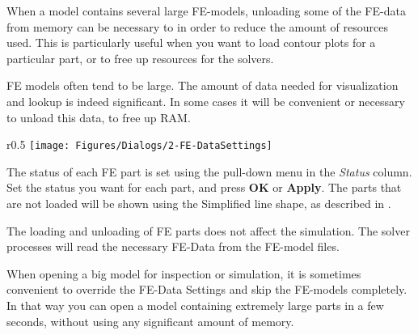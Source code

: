 
When a model contains several large FE-models, unloading some of the FE-data
from memory can be necessary to in order to reduce the amount of resources used.
This is particularly useful when you want to load contour plots for a
particular part, or to free up resources for the solvers.



FE models often tend to be large.
The amount of data needed for visualization and lookup is indeed significant.
In some cases it will be convenient or necessary to unload this data,
to free up RAM.


\begin{wrapfigure}[9]{r}{0.5\textwidth} \vskip-5mm
  \texttt{[image: Figures/Dialogs/2-FE-DataSettings]}
\end {wrapfigure}

The status of each FE part is set using the pull-down menu in the {\sl Status}
column. Set the status you want for each part,
and press \textbf{OK} or \textbf{Apply}.
The parts that are not loaded will be shown using the Simplified line shape,
as described in .

The loading and unloading of FE parts does not affect the simulation.
The solver processes will read the necessary FE-Data from the FE-model files.





When opening a big model for inspection or simulation, it is sometimes
convenient to override the FE-Data Settings and skip the FE-models
completely. In that way you can open a model containing extremely large
parts in a few seconds, without using any significant amount of memory.

